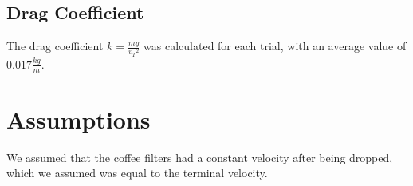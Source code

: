 \documentclass{article}
\begin{document}
\subsection{Drag Coefficient}
\begin{center}
\end{center}
The drag coefficient $k = \frac{mg}{{v_T}^2}$ was calculated for each trial, with an average value of $0.017 \frac{kg}{m}$.
\section{Assumptions}
We assumed that the coffee filters had a constant velocity after being dropped, which we assumed was equal to the terminal velocity.
\end{document}
